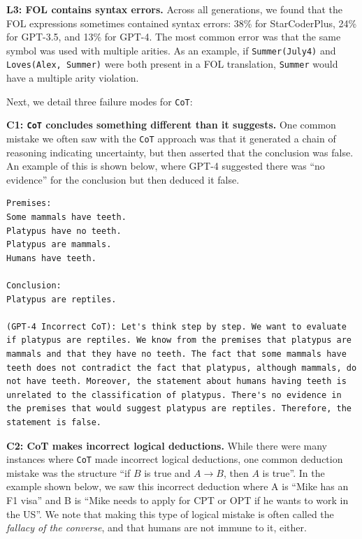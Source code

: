 \textbf{L3: FOL contains syntax errors.}  Across all generations, we found that the FOL expressions sometimes contained syntax errors: 38\% for StarCoderPlus, 24\% for GPT-3.5, and 13\% for GPT-4. The most common error was that the same symbol was used with multiple arities. As an example, if \texttt{Summer(July4)} and \texttt{Loves(Alex, Summer)} were both present in a FOL translation, \texttt{Summer} would have a multiple arity violation.

Next, we detail three failure modes for \texttt{CoT}:

\textbf{C1: \texttt{CoT} concludes something different than it suggests.} One common mistake we often saw with the \texttt{CoT} approach was that it generated a chain of reasoning indicating uncertainty, but then asserted that the conclusion was false. An example of this is shown below, where GPT-4 suggested there was ``no evidence'' for the conclusion but then deduced it false.

\begin{lstlisting}[breaklines=true,basicstyle=\small\ttfamily]
Premises:
Some mammals have teeth.
Platypus have no teeth.
Platypus are mammals.
Humans have teeth.

Conclusion:
Platypus are reptiles.

(GPT-4 Incorrect CoT): Let's think step by step. We want to evaluate if platypus are reptiles. We know from the premises that platypus are mammals and that they have no teeth. The fact that some mammals have teeth does not contradict the fact that platypus, although mammals, do not have teeth. Moreover, the statement about humans having teeth is unrelated to the classification of platypus. There's no evidence in the premises that would suggest platypus are reptiles. Therefore, the statement is false.
\end{lstlisting}

\textbf{C2: CoT makes incorrect logical deductions.} While there were many instances where \texttt{CoT} made incorrect logical deductions, one common deduction mistake was the structure ``if $B$ is true and $A \rightarrow B$, then $A$ is true''. In the example shown below, we saw this incorrect deduction where A is ``Mike has an F1 visa'' and B is ``Mike needs to apply for CPT or OPT if he wants to work in the US''. We note that making this type of logical mistake is often called the \emph{fallacy of the converse}, and that humans are not immune to it, either.

